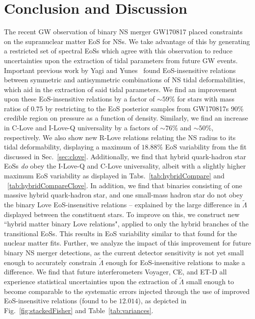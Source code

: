 \documentclass[prd,twocolumn,nofootinbib,superscriptaddress,amsmath,amssymb]{revtex4-1}
\begin{document}
\section{Conclusion and Discussion}\label{sec:conclusion}
The recent GW observation of binary NS merger GW170817 placed constraints on the supranuclear matter EoS for NSs.
We take advantage of this by generating a restricted set of spectral EoSs which agree with this observation to reduce uncertainties upon the extraction of tidal parameters from future GW events.
Important previous work by Yagi and Yunes~\cite{Yagi:ILQ,Yagi:binLove} found EoS-insensitive relations between symmetric and antisymmetric combinations of NS tidal deformabilities, which aid in the extraction of said tidal parameters.
We find an improvement upon these EoS-insensitive relations by a factor of $\sim 59$\% for stars with mass ratios of $0.75$ by restricting to the EoS posterior samples from GW170817s 90\% credible region on pressure as a function of density.
Similarly, we find an increase in C-Love and I-Love-Q universality by a factors of $\sim 76$\% and $\sim 50$\%, respectively.
We also show new R-Love relations relating the NS radius to its tidal deformability, displaying a maximum of $18.88\%$ EoS variability from the fit discussed in Sec.~\ref{sec:clove}.
Additionally, we find that hybrid quark-hadron star EoSs \emph{do} obey the I-Love-Q and C-Love universality, albeit with a slightly higher maximum EoS variability as displayed in Tabs.~\ref{tab:hybridCompare} and ~\ref{tab:hybridCompareClove}.
In addition, we find that binaries consisting of one massive hybrid quark-hadron star, and one small-mass hadron star do not obey the binary Love EoS-insensitive relations -- explained by the large difference in $\tilde{\Lambda}$ displayed between the constituent stars.
To improve on this, we construct new ``hybrid matter binary Love relations", applied to only the hybrid branches of the transitional EoSs.
This results in EoS variability similar to that found for the nuclear matter fits.
Further, we analyze the impact of this improvement for future binary NS merger detections, as the current detector sensitivity is not yet small enough to accurately constrain $\tilde{\Lambda}$ enough for EoS-insensitive relations to make a difference.
We find that future interferometers Voyager, CE, and ET-D all experience statistical uncertainties upon the extraction of $\tilde{\Lambda}$ small enough to become comparable to the systematic errors injected through the use of improved EoS-insensitive relations (found to be $12.014$), as depicted in Fig.~\ref{fig:stackedFisher} and Table~\ref{tab:variances}.
\end{document}
